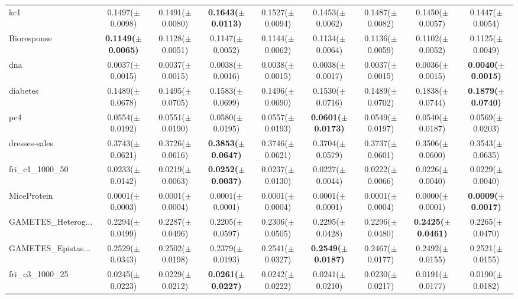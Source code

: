 \begin{longtable}{lcccccccc}
kc1 & 0.1497($\pm$0.0098) & 0.1491($\pm$0.0080) & \textbf{0.1643($\pm$0.0113)} & 0.1527($\pm$0.0094) & 0.1453($\pm$0.0062) & 0.1487($\pm$0.0082) & 0.1450($\pm$0.0057) & 0.1447($\pm$0.0054) \\
Bioresponse & \textbf{0.1149($\pm$0.0065)} & 0.1128($\pm$0.0051) & 0.1147($\pm$0.0052) & 0.1144($\pm$0.0062) & 0.1134($\pm$0.0064) & 0.1136($\pm$0.0059) & 0.1102($\pm$0.0052) & 0.1125($\pm$0.0049) \\
dna & 0.0037($\pm$0.0015) & 0.0037($\pm$0.0015) & 0.0038($\pm$0.0016) & 0.0038($\pm$0.0015) & 0.0038($\pm$0.0017) & 0.0037($\pm$0.0015) & 0.0036($\pm$0.0015) & \textbf{0.0040($\pm$0.0015)} \\
diabetes & 0.1489($\pm$0.0678) & 0.1495($\pm$0.0705) & 0.1583($\pm$0.0699) & 0.1496($\pm$0.0690) & 0.1530($\pm$0.0716) & 0.1489($\pm$0.0702) & 0.1838($\pm$0.0744) & \textbf{0.1879($\pm$0.0740)} \\
pc4 & 0.0554($\pm$0.0192) & 0.0551($\pm$0.0190) & 0.0580($\pm$0.0195) & 0.0557($\pm$0.0193) & \textbf{0.0601($\pm$0.0173)} & 0.0549($\pm$0.0197) & 0.0540($\pm$0.0187) & 0.0569($\pm$0.0203) \\
dresses-sales & 0.3743($\pm$0.0621) & 0.3726($\pm$0.0616) & \textbf{0.3853($\pm$0.0647)} & 0.3746($\pm$0.0621) & 0.3704($\pm$0.0579) & 0.3737($\pm$0.0601) & 0.3506($\pm$0.0600) & 0.3543($\pm$0.0635) \\
fri\_c1\_1000\_50 & 0.0233($\pm$0.0142) & 0.0219($\pm$0.0063) & \textbf{0.0252($\pm$0.0037)} & 0.0237($\pm$0.0130) & 0.0227($\pm$0.0044) & 0.0222($\pm$0.0066) & 0.0226($\pm$0.0040) & 0.0229($\pm$0.0040) \\
MiceProtein & 0.0001($\pm$0.0003) & 0.0001($\pm$0.0004) & 0.0001($\pm$0.0001) & 0.0001($\pm$0.0004) & 0.0001($\pm$0.0001) & 0.0001($\pm$0.0004) & 0.0000($\pm$0.0001) & \textbf{0.0009($\pm$0.0017)} \\
GAMETES\_Heterog... & 0.2294($\pm$0.0499) & 0.2287($\pm$0.0496) & 0.2205($\pm$0.0597) & 0.2306($\pm$0.0505) & 0.2295($\pm$0.0428) & 0.2296($\pm$0.0480) & \textbf{0.2425($\pm$0.0461)} & 0.2265($\pm$0.0470) \\
GAMETES\_Epistas... & 0.2529($\pm$0.0343) & 0.2502($\pm$0.0198) & 0.2379($\pm$0.0193) & 0.2541($\pm$0.0327) & \textbf{0.2549($\pm$0.0187)} & 0.2467($\pm$0.0177) & 0.2492($\pm$0.0155) & 0.2521($\pm$0.0155) \\
fri\_c3\_1000\_25 & 0.0245($\pm$0.0223) & 0.0229($\pm$0.0212) & \textbf{0.0261($\pm$0.0227)} & 0.0242($\pm$0.0222) & 0.0241($\pm$0.0210) & 0.0230($\pm$0.0217) & 0.0191($\pm$0.0177) & 0.0190($\pm$0.0182) \\

\end{longtable}

